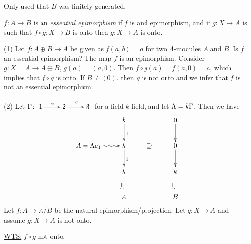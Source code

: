 \begin{note}
Only used that $B$ was finitely generated.
\end{note}

\begin{defin}
$f \colon A \to B$ is an \emph{essential
  epimorphism} if $f$ is and
epimorphism, and if $g\colon X \to A$ is such that $f \circ g \colon X \to B$ is
onto then $g\colon X \to A$ is onto. 
\end{defin}
\begin{exam}
  (1) Let $f\colon A \oplus B \to A$ be given as $f(a,b) = a$ for two
  $\Lambda$-modules $A$ and $B$. Is $f$ an essential epimorphism? The
  map $f$ is an epimorphism. Consider $g\colon X= A \to A \oplus B$,
  $g(a)=(a, 0)$. Then $f \circ g(a) = f(a,0)=a$, which implies that $f
  \circ g$ is onto. If $B \neq (0)$, then $g$ is not onto and we infer
  that $f$ is not an  essential epimorphism.

(2) Let $\G \colon \xymatrix{1\ar[r]^\alpha & 2\ar[r]^\beta & 3}$ for a
field $k$ field, and let $\Lambda = k\Gamma$. Then we have
\[\xymatrix{
&                             k\ar[d]^1 && 0\ar[d]\\
A = \Lambda e_1 \ar@{~>}[r] & k\ar[d]^1 &\supseteq& 0\ar[d]\\
 & k\ar@{}[d]|-*[@]{=:} && k\ar@{}[d]|-*[@]{=:}\\
 & A && B
}\]
Let $f\colon A \to A/B$ be the natural epimorphism/projection. Let $g\colon X
\to A$ and assume $g\colon X \to A$ is not onto.

\underline{WTS:} $f \circ g$ not onto.\\


\end{exam}
